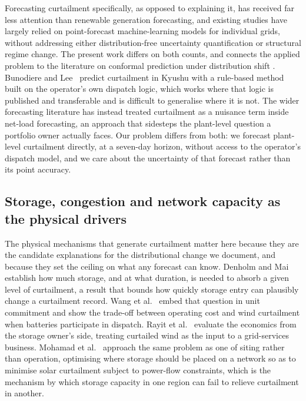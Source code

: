 \documentclass[preprint,3p,times]{elsarticle}
\providecommand{\DIFaddtex}[1]{{\protect\color{blue} \sf #1}} %
\providecommand{\DIFdeltex}[1]{{\protect\color{red} \scriptsize #1}} %
\providecommand{\DIFaddbegin}{} %
\providecommand{\DIFaddend}{} %
\providecommand{\DIFdelbegin}{} %
\providecommand{\DIFdelend}{} %
\providecommand{\DIFadd}[1]{\texorpdfstring{\DIFaddtex{#1}}{#1}} %
\providecommand{\DIFdel}[1]{\texorpdfstring{\DIFdeltex{#1}}{}} %
\begin{document}
\DIFadd{Forecasting curtailment specifically, as opposed to explaining it, }\DIFaddend has received far less attention\DIFdelbegin \DIFdel{than renewable generation forecasting, and existing studies have largely relied on point-forecast machine-learning models for individual grids, without addressing either distribution-free uncertainty quantification or structural regime change.
The present work differs on both counts, and connects the applied problem to the literature on conformal prediction under distribution shift }\DIFdelend \DIFaddbegin \DIFadd{. Bunodiere and Lee~\cite{bunodiere2020} predict curtailment in Kyushu with a rule-based method built on the operator's own dispatch logic, which works where that logic is published and transferable and is difficult to generalise where it is not. The wider forecasting literature has instead treated curtailment as a nuisance term inside net-load forecasting, an approach that sidesteps the plant-level question a portfolio owner actually faces. Our problem differs from both: we forecast plant-level curtailment directly, at a seven-day horizon, without access to the operator's dispatch model, and we care about the uncertainty of that forecast rather than its point accuracy.
}

\subsection{Storage, congestion and network capacity as the physical drivers}

\DIFadd{The physical mechanisms that generate curtailment matter here because they are the candidate explanations for the distributional change we document, and because they set the ceiling on what any forecast can know. Denholm and Mai~\cite{denholm2019} establish how much storage, and at what duration, is needed to absorb a given level of curtailment, a result that bounds how quickly storage entry can plausibly change a curtailment record. Wang et al.~\cite{wang2019} embed that question in unit commitment and show the trade-off between operating cost and wind curtailment when batteries participate in dispatch. Rayit et al.~\cite{rayit2021} evaluate the economics from the storage owner's side, treating curtailed wind as the input to a grid-services business. Mohamad et al.~\cite{mohamad2021} approach the same problem as one of siting rather than operation, optimising where storage should be placed on a network so as to minimise solar curtailment subject to power-flow constraints, which is the mechanism by which storage capacity in one region can fail to relieve curtailment in another.
}
\end{document}
